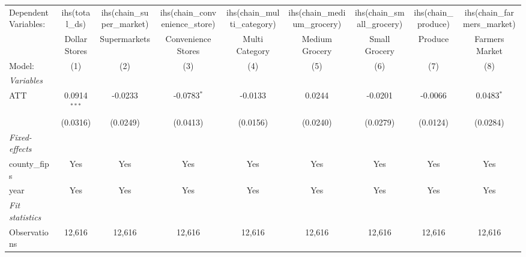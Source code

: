 
\begingroup
\centering
\begin{tabular}{lcccccccc}
   \tabularnewline \midrule \midrule
   Dependent Variables: & ihs(total\_ds)  & ihs(chain\_super\_market)   & ihs(chain\_convenience\_store)   & ihs(chain\_multi\_category)   & ihs(chain\_medium\_grocery)   & ihs(chain\_small\_grocery)   & ihs(chain\_produce)  & ihs(chain\_farmers\_market)\\    
                        & Dollar Stores   & Supermarkets                & Convenience Stores               & Multi Category                & Medium Grocery                & Small Grocery                & Produce              & Farmers Market \\   
   Model:               & (1)             & (2)                         & (3)                              & (4)                           & (5)                           & (6)                          & (7)                  & (8)\\  
   \midrule
   \emph{Variables}\\
   ATT                  & 0.0914$^{***}$  & -0.0233                     & -0.0783$^{*}$                    & -0.0133                       & 0.0244                        & -0.0201                      & -0.0066              & 0.0483$^{*}$\\   
                        & (0.0316)        & (0.0249)                    & (0.0413)                         & (0.0156)                      & (0.0240)                      & (0.0279)                     & (0.0124)             & (0.0284)\\   
   \midrule
   \emph{Fixed-effects}\\
   county\_fips         & Yes             & Yes                         & Yes                              & Yes                           & Yes                           & Yes                          & Yes                  & Yes\\  
   year                 & Yes             & Yes                         & Yes                              & Yes                           & Yes                           & Yes                          & Yes                  & Yes\\  
   \midrule
   \emph{Fit statistics}\\
   Observations         & 12,616          & 12,616                      & 12,616                           & 12,616                        & 12,616                        & 12,616                       & 12,616               & 12,616\\  

\end{tabular}
